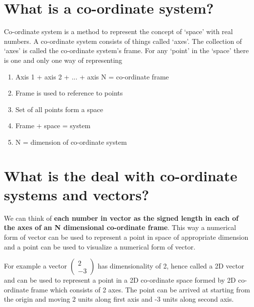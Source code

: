 \documentclass[12pt]{article}
\newcommand{\comment}[1]{}
\begin{document}
\section{What is a co-ordinate system?}
Co-ordinate system is a method to represent the concept of `space' with real numbers.
A co-ordinate system consists of things called `axes'. The collection of `axes' is called the co-ordinate system's frame.
For any `point' in the `space' there is one and only one way of representing 
\begin{enumerate}
  \item Axis 1 + axis 2 + ... + axis N = co-ordinate frame
  \item Frame is used to reference to points
  \item Set of all points form a space
  \item Frame + space = system
  \item N = dimension of co-ordinate system
\end{enumerate}

\section{What is the deal with co-ordinate systems and vectors?}
We can think of \textbf{each number in vector as the signed length in each of the axes of an N dimensional co-ordinate frame}.
This way a numerical form of vector can be used to represent a point in space of appropriate dimension and a point can be used to visualize a numerical form of vector.

\begin{figure}[h]
  \centering
\end{figure}


For example a vector $ \comment{Column-Vector: 2, -3} \begin{pmatrix} 2 \\  -3 \end{pmatrix} $  has dimensionality of 2, hence called a 2D vector and can be used to represent a point in a 2D co-ordinate space formed by 2D co-ordinate frame which consists of 2 axes. The point can be arrived at starting from the origin and moving 2 units along first axis and -3 units along second axis.
\end{document}
